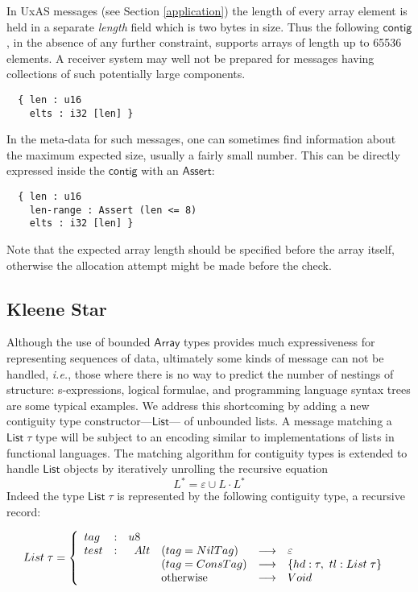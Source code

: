 \documentclass[a4paper,UKenglish,cleveref, autoref, thm-restate]{lipics-v2021}
\newcommand{\ie}{\textit{i.e.}}
\newcommand{\konst}[1]{\ensuremath{\mathsf{#1}}}
\newcommand{\kstar}[1]{\ensuremath{{#1}^{*}}}
\begin{document}
\begin{example}

In UxAS messages (see Section \ref{application}) the length of every
array element is held in a separate \emph{length} field which is two
bytes in size. Thus the following \konst{contig}, in the absence of
any further constraint, supports arrays of length up to 65536
elements. A receiver system may well not be prepared for messages
having collections of such potentially large components.
{\small
\begin{verbatim}
  { len : u16
    elts : i32 [len] }
\end{verbatim}
}
\noindent In the meta-data for such messages, one can sometimes find
information about the maximum expected size, usually a fairly small
number. This can be directly expressed inside the \konst{contig} with
an \konst{Assert}:
{\small
\begin{verbatim}
  { len : u16
    len-range : Assert (len <= 8)
    elts : i32 [len] }
\end{verbatim}
}
\noindent Note that the expected array length should be specified
before the array itself, otherwise the allocation attempt might be
made before the check.
\end{example}

\subsection{Kleene Star}\label{list-type}

Although the use of bounded \konst{Array} types provides much
expressiveness for representing sequences of data, ultimately some
kinds of message can not be handled, \ie, those where there is no way to
predict the number of nestings of structure: s-expressions, logical
formulae, and programming language syntax trees are some typical
examples. We address this shortcoming by adding a new contiguity type
constructor---\konst{List}--- of unbounded lists. A message matching a
$\konst{List}\;\tau$ type will be subject to an encoding similar to
implementations of lists in functional languages. The matching
algorithm for contiguity types is extended to handle \konst{List}
objects by iteratively unrolling the recursive equation
%
\[ \kstar{L} = \varepsilon \cup L \cdot \kstar{L} \]
%
Indeed the type $\konst{List}\;\tau$ is represented by the following
contiguity type, a recursive record:

\[
 \konst{List}\;\tau =
   \left\{
     \begin{array}{lcl}
       \konst{tag} & : & \konst{u8} \\
       \konst{test} & : &
       \begin{array}[t] {lcl}
         \konst{Alt} \quad (\konst{tag} = \konst{NilTag}) & \longrightarrow & \varepsilon \\
\phantom{\konst{Alt}} \quad (\konst{tag} = \konst{ConsTag}) & \longrightarrow &
          \{ \konst{hd} : \tau, \ \konst{tl} : \konst{List}\; \tau \} \\
\phantom{\konst{Alt}} \quad \text{otherwise} & \longrightarrow & \konst{Void}
        \end{array}
     \end{array}
   \right.
\]
\end{document}
